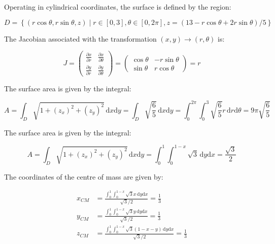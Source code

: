 \documentclass[12pt]{article}
\begin{document}

Operating in cylindrical coordinates, the surface is defined by the region:

\begin{equation}
    D = \left\{ (r\cos{\theta}, r \sin{\theta}, z) \mid r \in [0, 3], \theta \in [0, 2\pi], z = (13 - r\cos{\theta} + 2r\sin{\theta})/5 \right\}
\end{equation}

The Jacobian associated with the transformation $(x ,y) \to (r, \theta)$ is:

\begin{equation}
    J
    =
    \begin{pmatrix}
        \frac{\partial x}{\partial r} & \frac{\partial x}{\partial \theta} \\
        \frac{\partial y}{\partial r} & \frac{\partial y}{\partial \theta}
    \end{pmatrix}
    =
    \begin{pmatrix}
        \cos{\theta} & -r \sin{\theta} \\
        \sin{\theta} & r \cos{\theta}
    \end{pmatrix}
    =
    r
\end{equation}


The surface area is given by the integral:

\begin{equation}
    A = \int_{D} \sqrt{1 + (z_{x})^{2} + (z_{y})^{2}} \, \mathrm{d}x \mathrm{d}y = \int_{D} \sqrt{\frac{6}{5}} \, \mathrm{d}x \mathrm{d}y = \int_{0}^{2\pi} \int_{0}^{3} \sqrt{\frac{6}{5}} r \, \mathrm{d}r \mathrm{d}\theta = 9 \pi \sqrt{\frac{6}{5}}
\end{equation}


The surface area is given by the integral:

\begin{equation}
    A = \int_{D} \sqrt{1 + (z_{x})^{2} + (z_{y})^{2}} \, \mathrm{d}x \mathrm{d}y = \int_{0}^{1} \int_{0}^{1-x} \sqrt{3} \, \mathrm{d}y \mathrm{d}x = \frac{\sqrt{3}}{2}
\end{equation}

The coordinates of the centre of mass are given by:

\begin{equation}
    \begin{split}
        x_{CM} &= \frac{\int_{0}^{1} \int_{0}^{1-x} \sqrt{3} x \, \mathrm{d}y \mathrm{d}x}{\sqrt{3}/2} = \frac{1}{3} \\
        y_{CM} &= \frac{\int_{0}^{1} \int_{0}^{1-x} \sqrt{3} y \, \mathrm{d}y \mathrm{d}x}{\sqrt{3}/2} = \frac{1}{3} \\
        z_{CM} &= \frac{\int_{0}^{1} \int_{0}^{1-x} \sqrt{3} (1 - x - y) \, \mathrm{d}y \mathrm{d}x}{\sqrt{3}/2} = \frac{1}{3}
    \end{split}
\end{equation}
\end{document}

